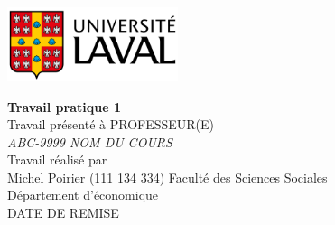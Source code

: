 
\thispagestyle{empty}	                        %
\begin{center}
    \includegraphics[width=5cm]{template/logo.png}	    %
\end{center}
\vspace{4cm}	                                %
\begin{center}	                                %
    {\huge \bf Travail pratique 1}\\                        %
    \vspace{3cm}
    \large Travail présenté à PROFESSEUR(E)\\\textit{ABC-9999 NOM DU COURS} \\
    \vspace{3cm}
    Travail réalisé par\\Michel Poirier (111 134 334)
    \vfill	                                    %
    Faculté des Sciences Sociales\\
    Département d'économique\\
    DATE DE REMISE
\end{center}
\newpage
